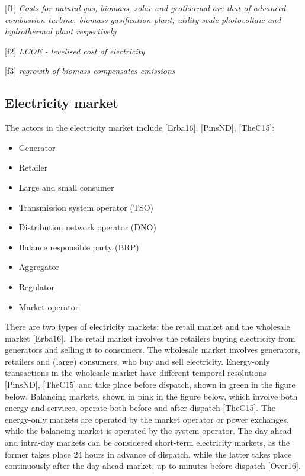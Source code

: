 \protect\hypertarget{f1}{}{{[}f1{]}} \emph{Costs for natural gas,
biomass, solar and geothermal are that of advanced combustion turbine,
biomass gasification plant, utility-scale photovoltaic and hydrothermal
plant respectively}

\protect\hypertarget{f2}{}{{[}f2{]}} \emph{LCOE - levelised cost of
electricity}

\protect\hypertarget{f3}{}{{[}f3{]}} \emph{regrowth of biomass
compensates emissions}

\hypertarget{electricity-market}{%
\subsection{Electricity market}\label{electricity-market}}

The actors in the electricity market include {[}Erba16{]}, {[}PinsND{]},
{[}TheC15{]}:

\begin{itemize}
\tightlist
\item
  Generator
\item
  Retailer
\item
  Large and small consumer
\item
  Transmission system operator (TSO)
\item
  Distribution network operator (DNO)
\item
  Balance responsible party (BRP)
\item
  Aggregator
\item
  Regulator
\item
  Market operator
\end{itemize}

There are two types of electricity markets; the retail market and the
wholesale market {[}Erba16{]}. The retail market involves the retailers
buying electricity from generators and selling it to consumers. The
wholesale market involves generators, retailers and (large) consumers,
who buy and sell electricity. Energy-only transactions in the wholesale
market have different temporal resolutions {[}PinsND{]}, {[}TheC15{]}
and take place before dispatch, shown in green in the figure below.
Balancing markets, shown in pink in the figure below, which involve both
energy and services, operate both before and after dispatch
{[}TheC15{]}. The energy-only markets are operated by the market
operator or power exchanges, while the balancing market is operated by
the system operator. The day-ahead and intra-day markets can be
considered short-term electricity markets, as the former takes place 24
hours in advance of dispatch, while the latter takes place continuously
after the day-ahead market, up to minutes before dispatch {[}Over16{]}.

